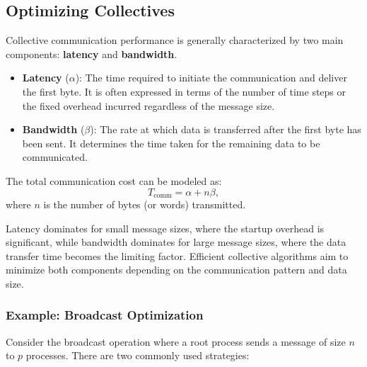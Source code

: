 \documentclass[12pt]{book}
\begin{document}
\subsection{Optimizing Collectives}
Collective communication performance is generally characterized by two main components: \textbf{latency} and \textbf{bandwidth}.
\begin{itemize}
    \item \textbf{Latency} ($\alpha$): The time required to initiate the communication and deliver the first byte. It is often expressed in terms of the number of time steps or the fixed overhead incurred regardless of the message size.
    \item \textbf{Bandwidth} ($\beta$): The rate at which data is transferred after the first byte has been sent. It determines the time taken for the remaining data to be communicated.
\end{itemize}

The total communication cost can be modeled as:
\[
T_\text{comm} = \alpha + n\beta,
\]
where $n$ is the number of bytes (or words) transmitted.

Latency dominates for small message sizes, where the startup overhead is significant, while bandwidth dominates for large message sizes, where the data transfer time becomes the limiting factor. Efficient collective algorithms aim to minimize both components depending on the communication pattern and data size.

\subsubsection*{Example: Broadcast Optimization}
Consider the broadcast operation where a root process sends a message of size $n$ to $p$ processes. There are two commonly used strategies:
\end{document}
